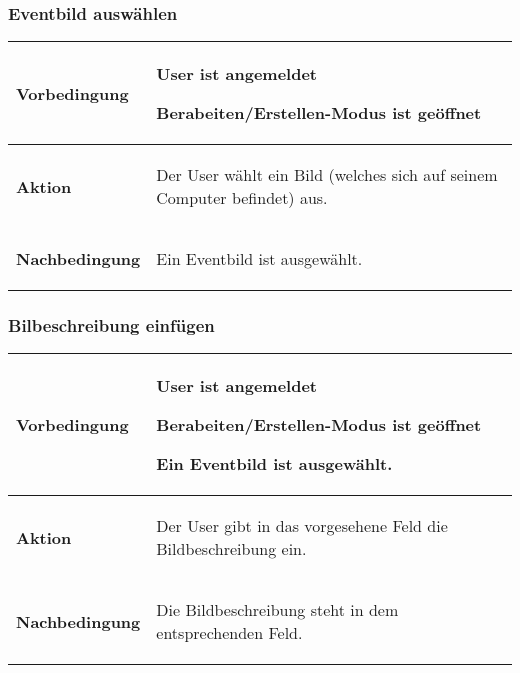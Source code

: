 \documentclass[11pt,a4paper,titlepage,portrait,ngerman]{scrartcl}
\begin{document}
\subsubsection*{Eventbild auswählen}
\vspace{2.5mm}
\noindent
\begin{tabular}{|p{}||p{}|}
\hline \rule[-2ex]{0pt}{5.5ex} \textbf{Vorbedingung} & {
	\begin{list}{\textendash}{\vspace{-5mm}}
		\item{User ist angemeldet}
		\item{Berabeiten/Erstellen-Modus ist geöffnet}
	\end{list}
} \\ 
\hline \rule[-2ex]{0pt}{5.5ex} \textbf{Aktion} & {
	\begin{list}{\textendash}{\vspace{-5mm}}
		\item{Der User wählt ein Bild (welches sich auf seinem Computer befindet) aus.}
	\end{list}
} \\ 
\hline \rule[-2ex]{0pt}{5.5ex} \textbf{Nachbedingung} & {
	\begin{list}{\textendash}{\vspace{-5mm}}
		\item{Ein Eventbild ist ausgewählt.}
	\end{list}
}  \\
\hline 
\end{tabular}

\subsubsection*{Bilbeschreibung einfügen}
\vspace{2.5mm}
\noindent
\begin{tabular}{|p{}||p{}|}
\hline \rule[-2ex]{0pt}{5.5ex} \textbf{Vorbedingung} & {
	\begin{list}{\textendash}{\vspace{-5mm}}
		\item{User ist angemeldet}
		\item{Berabeiten/Erstellen-Modus ist geöffnet}
		\item{Ein Eventbild ist ausgewählt.}
	\end{list}
} \\ 
\hline \rule[-2ex]{0pt}{5.5ex} \textbf{Aktion} & {
	\begin{list}{\textendash}{\vspace{-5mm}}
		\item{Der User gibt in das vorgesehene Feld die Bildbeschreibung ein.}
	\end{list}
} \\ 
\hline \rule[-2ex]{0pt}{5.5ex} \textbf{Nachbedingung} & {
	\begin{list}{\textendash}{\vspace{-5mm}}
		\item{Die Bildbeschreibung steht in dem entsprechenden Feld.}
	\end{list}
}  \\
\hline 
\end{tabular}
\newpage
\end{document}
